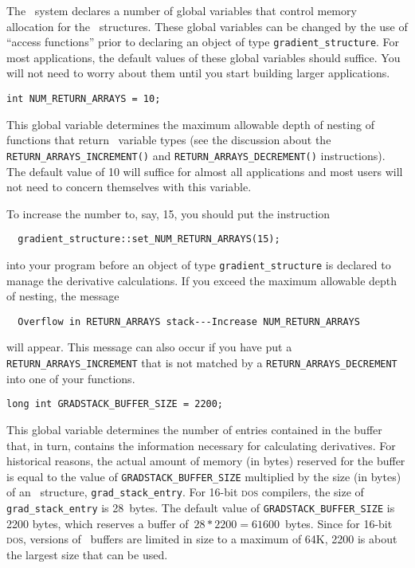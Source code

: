 \documentclass{admbmanual}
\begin{document}
The \scAD\ system declares a number of global variables that
control memory allocation for the \scAD\ structures.
These global variables can be changed by the use of
``access functions'' prior to declaring an object of type
\texttt{gradient\_structure}.  
For most applications, the
default values of these global variables should suffice. You will
not need to worry about them until you start building larger applications.

\bigskip
{}
\begin{lstlisting}
int NUM_RETURN_ARRAYS = 10;  
\end{lstlisting}  
This global variable determines the maximum allowable depth of 
nesting of functions that return \scAD\ variable types (see the discussion about
the \texttt{RETURN\_ARRAYS\_INCREMENT()} and 
\texttt{RETURN\_ARRAYS\_DECREMENT()} instructions).
The default value of 10 will suffice for almost all applications and
most users will not need to concern themselves with this variable.

To increase the number to, say, 15, you should put the instruction
\begin{lstlisting}
  gradient_structure::set_NUM_RETURN_ARRAYS(15);  
\end{lstlisting}
into your program before an object of type \texttt{gradient\_structure}
is declared to manage the derivative calculations.
If you exceed the maximum allowable depth of nesting, the message
\begin{lstlisting}
  Overflow in RETURN_ARRAYS stack---Increase NUM_RETURN_ARRAYS
\end{lstlisting}
will appear. This message can also occur if you have put a
\texttt{RETURN\_ARRAYS\_INCREMENT} that is not matched by a
\texttt{RETURN\_ARRAYS\_DECREMENT} into one of your functions.


\bigskip
{}
\begin{lstlisting}
long int GRADSTACK_BUFFER_SIZE = 2200;  
\end{lstlisting}  
This global variable determines the number of entries contained in
the buffer that, in turn, contains the information necessary for calculating 
derivatives. For historical reasons, the actual amount of memory (in bytes) reserved for the buffer is equal to the value of
\texttt{GRADSTACK\_BUFFER\_SIZE} 
multiplied by the size (in bytes) of an \scAD\ structure,
\texttt{grad\_\-stack\_\-entry}. For 16-bit \textsc{dos} compilers, the size of
\texttt{grad\_stack\_entry} is 28~bytes. The default value of 
\texttt{GRADSTACK\_BUFFER\_SIZE} is 2200 bytes, which reserves a buffer 
of~$28*2200=61600$~bytes.  Since for 16-bit \textsc{dos}, versions of \scAD\ buffers 
are limited in size
to a maximum of 64K, 2200 is about the largest size that can be used.
\end{document}
